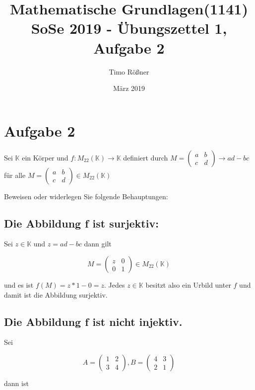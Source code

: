 \documentclass{article}
\title{Mathematische Grundlagen(1141) SoSe 2019 - Übungszettel 1, Aufgabe 2}
\author{Timo Rößner }
\date{März 2019}
\begin{document}
\maketitle

\section*{Aufgabe 2}

Sei \(\mathbb{K}\) ein Körper und \(f: M_{22}(\mathbb{K}) \rightarrow \mathbb{K}\) definiert durch
\(
M=
  \begin{pmatrix}
    a & b \\
    c & d
  \end{pmatrix}
\rightarrow ad - bc
\)
für alle
\(
M=
  \begin{pmatrix}
    a & b \\
    c & d
  \end{pmatrix}
\in M_{22}(\mathbb{K})
\)

Beweisen oder widerlegen Sie folgende Behauptungen:

\subsection*{Die Abbildung f ist surjektiv:}

Sei \(z \in \mathbb{K}\) und \(z = ad - bc\) dann gilt

\[
M =
  \begin{pmatrix}
    z & 0 \\
    0 & 1
  \end{pmatrix}
  \in M_{22}(\mathbb{K})
\]

und es ist \( f(M) = z*1 - 0 = z \). Jedes \(z \in \mathbb{K}\) besitzt also ein Urbild unter \(f\) und damit ist die Abbildung surjektiv.

\subsection*{Die Abbildung f ist nicht injektiv.}

Sei

\[
A=
  \begin{pmatrix}
    1 & 2 \\
    3 & 4
  \end{pmatrix}
,
B=
  \begin{pmatrix}
    4 & 3 \\
    2 & 1
  \end{pmatrix}
\]

dann ist
\end{document}
